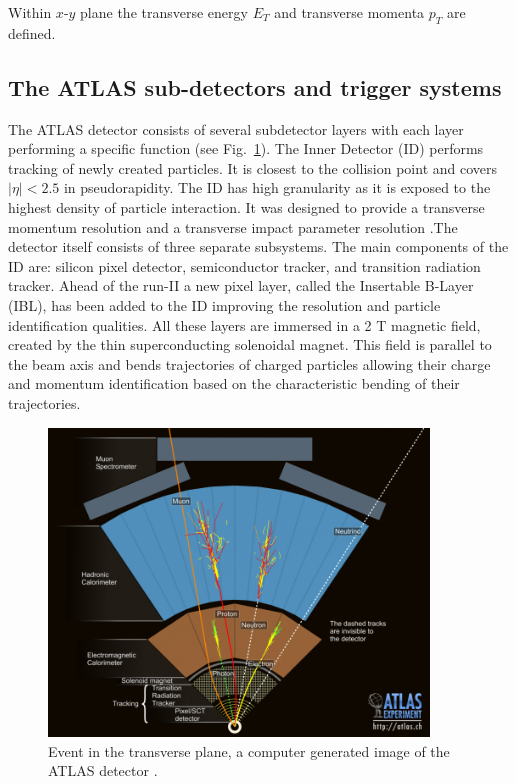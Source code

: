Within $x$-$y$ plane the transverse energy $E_{T}$ and transverse momenta $p_{T}$ are defined.

\subsection{ The ATLAS sub-detectors and trigger systems}

The ATLAS detector consists of several subdetector layers with each layer performing a specific function (see Fig.~\ref{fig:event}). The Inner Detector (ID) performs tracking of newly created particles. It is closest to the collision point and covers $|\eta|<2.5$ in pseudorapidity. The ID has high granularity as it is exposed to the highest density of particle interaction. It was designed to provide a transverse momentum resolution and a transverse impact parameter resolution \citep{aad2010atlas}.The detector itself consists of three separate subsystems. The main components of the ID are: silicon pixel detector, semiconductor tracker, and transition radiation tracker. Ahead of the run-II a new pixel layer, called the Insertable B-Layer (IBL), has been added to the ID improving the resolution and particle identification qualities. All these layers are immersed in a 2 T magnetic field, created by the thin superconducting solenoidal magnet. This field is parallel to the beam axis and bends trajectories of charged particles allowing their charge and momentum identification based on the characteristic bending of their trajectories. 
\begin{figure}[!h]
	\centering
    \captionsetup{width=0.9\textwidth}
	\includegraphics[width=0.9\textwidth]{Chap2/0803022_01.jpg}
\caption[Event in the transverse plane]{\label{fig:event} Event in the transverse plane, a computer generated image of the ATLAS detector \cite{event}. }
\end{figure}

